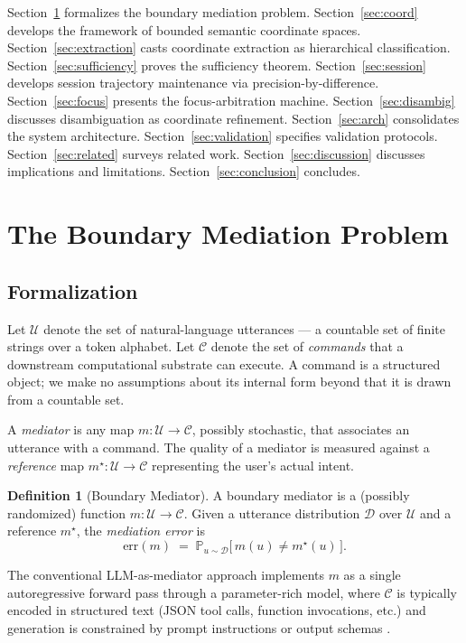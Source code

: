 \documentclass[11pt,a4paper]{article}
\theoremstyle{definition}
\newtheorem{definition}[theorem]{Definition}
\theoremstyle{remark}
\renewcommand{\Pr}{\mathbb{P}}
\newcommand{\Cc}{\mathcal{C}}
\newcommand{\Uc}{\mathcal{U}}
\begin{document}
Section~\ref{sec:problem} formalizes the boundary mediation problem.
Section~\ref{sec:coord} develops the framework of bounded semantic coordinate spaces.
Section~\ref{sec:extraction} casts coordinate extraction as hierarchical classification.
Section~\ref{sec:sufficiency} proves the sufficiency theorem.
Section~\ref{sec:session} develops session trajectory maintenance via precision-by-difference.
Section~\ref{sec:focus} presents the focus-arbitration machine.
Section~\ref{sec:disambig} discusses disambiguation as coordinate refinement.
Section~\ref{sec:arch} consolidates the system architecture.
Section~\ref{sec:validation} specifies validation protocols.
Section~\ref{sec:related} surveys related work.
Section~\ref{sec:discussion} discusses implications and limitations.
Section~\ref{sec:conclusion} concludes.

\section{The Boundary Mediation Problem}
\label{sec:problem}

\subsection{Formalization}

Let $\Uc$ denote the set of natural-language utterances --- a countable set of finite strings over a token alphabet. Let $\Cc$ denote the set of \emph{commands} that a downstream computational substrate can execute. A command is a structured object; we make no assumptions about its internal form beyond that it is drawn from a countable set.

A \emph{mediator} is any map $m: \Uc \to \Cc$, possibly stochastic, that associates an utterance with a command. The quality of a mediator is measured against a \emph{reference} map $m^\star: \Uc \to \Cc$ representing the user's actual intent.

\begin{definition}[Boundary Mediator]
\label{def:mediator}
A boundary mediator is a (possibly randomized) function $m: \Uc \to \Cc$. Given a utterance distribution $\mathcal{D}$ over $\Uc$ and a reference $m^\star$, the \emph{mediation error} is
\[
\mathrm{err}(m) \;=\; \Pr_{u \sim \mathcal{D}}\bigl[\, m(u) \neq m^\star(u) \,\bigr].
\]
\end{definition}

The conventional LLM-as-mediator approach implements $m$ as a single autoregressive forward pass through a parameter-rich model, where $\Cc$ is typically encoded in structured text (JSON tool calls, function invocations, etc.) and generation is constrained by prompt instructions or output schemas \citep{schick2024toolformer}.
\end{document}
